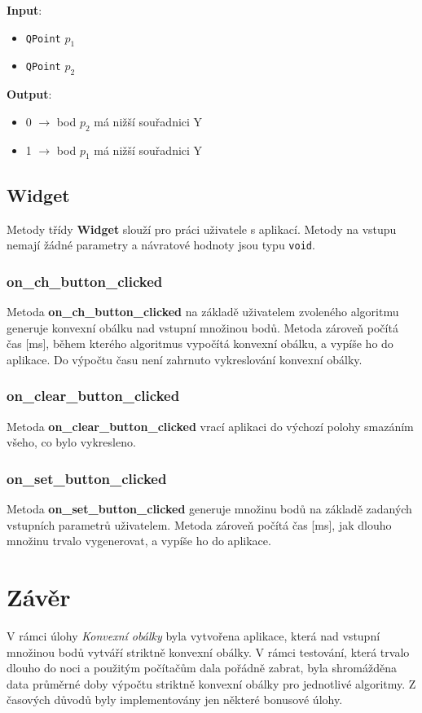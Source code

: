 \documentclass[a4paper, 12pt]{article}
\begin{document}
\textbf{Input}:
\begin{itemize}
\item \texttt{QPoint} $p_1$
\item \texttt{QPoint} $p_2$
\end{itemize}

\textbf{Output}:
\begin{itemize}
\item 0 $\rightarrow$ bod $p_2$ má nižší souřadnici Y
\item 1 $\rightarrow$ bod $p_1$ má nižší souřadnici Y
\end{itemize}

\subsection{Widget}
Metody třídy \textbf{Widget} slouží pro práci uživatele s aplikací. Metody na vstupu nemají žádné parametry a návratové hodnoty jsou typu \texttt{void}.

\subsubsection*{on\_ch\_button\_clicked}
Metoda \textbf{on\_ch\_button\_clicked} na základě uživatelem zvoleného algoritmu generuje konvexní obálku nad vstupní množinou bodů. Metoda zároveň počítá čas [ms], během kterého algoritmus vypočítá konvexní obálku, a vypíše ho do aplikace. Do výpočtu času není zahrnuto vykreslování konvexní obálky.

\subsubsection*{on\_clear\_button\_clicked}
Metoda \textbf{on\_clear\_button\_clicked} vrací aplikaci do výchozí polohy smazáním všeho, co bylo vykresleno. 

\subsubsection*{on\_set\_button\_clicked}
Metoda \textbf{on\_set\_button\_clicked} generuje množinu bodů na základě zadaných vstupních parametrů uživatelem. Metoda zároveň počítá čas [ms], jak dlouho množinu trvalo vygenerovat, a vypíše ho do aplikace.

\clearpage
\section{Závěr}
V rámci úlohy \textit{Konvexní obálky} byla vytvořena aplikace, která nad vstupní množinou bodů vytváří striktně konvexní obálky. V rámci testování, která trvalo dlouho do noci a použitým počítačům dala pořádně zabrat, byla shromážděna data průměrné doby výpočtu striktně konvexní obálky pro jednotlivé algoritmy. Z časových důvodů byly implementovány jen některé bonusové úlohy.\\
\end{document}
